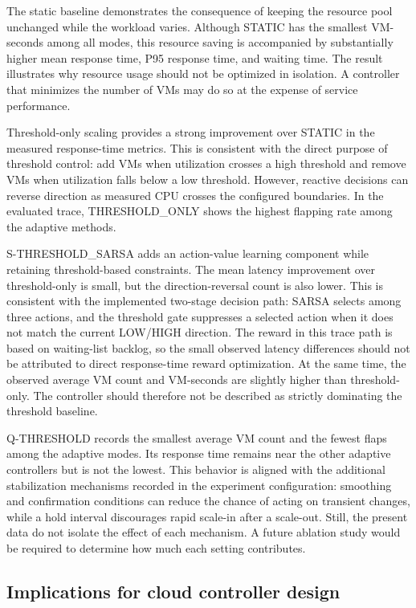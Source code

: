 \documentclass[pdflatex,sn-mathphys-num]{sn-jnl}
\begin{document}
The static baseline demonstrates the consequence of keeping the resource pool unchanged while the workload varies. Although STATIC has the smallest VM-seconds among all modes, this resource saving is accompanied by substantially higher mean response time, P95 response time, and waiting time. The result illustrates why resource usage should not be optimized in isolation. A controller that minimizes the number of VMs may do so at the expense of service performance.

Threshold-only scaling provides a strong improvement over STATIC in the measured response-time metrics. This is consistent with the direct purpose of threshold control: add VMs when utilization crosses a high threshold and remove VMs when utilization falls below a low threshold. However, reactive decisions can reverse direction as measured CPU crosses the configured boundaries. In the evaluated trace, THRESHOLD\_ONLY shows the highest flapping rate among the adaptive methods.

S-THRESHOLD\_SARSA adds an action-value learning component while retaining threshold-based constraints. The mean latency improvement over threshold-only is small, but the direction-reversal count is also lower. This is consistent with the implemented two-stage decision path: SARSA selects among three actions, and the threshold gate suppresses a selected action when it does not match the current LOW/HIGH direction. The reward in this trace path is based on waiting-list backlog, so the small observed latency differences should not be attributed to direct response-time reward optimization. At the same time, the observed average VM count and VM-seconds are slightly higher than threshold-only. The controller should therefore not be described as strictly dominating the threshold baseline.

Q-THRESHOLD records the smallest average VM count and the fewest flaps among the adaptive modes. Its response time remains near the other adaptive controllers but is not the lowest. This behavior is aligned with the additional stabilization mechanisms recorded in the experiment configuration: smoothing and confirmation conditions can reduce the chance of acting on transient changes, while a hold interval discourages rapid scale-in after a scale-out. Still, the present data do not isolate the effect of each mechanism. A future ablation study would be required to determine how much each setting contributes.

\subsection{Implications for cloud controller design}
\end{document}
